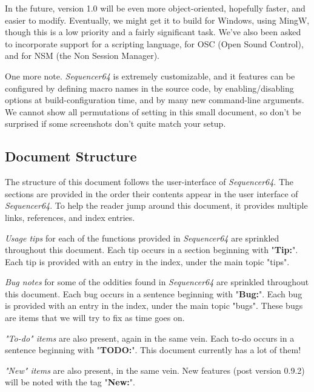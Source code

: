 \documentclass[
 11pt,
 twoside,
 a4paper,
 headinclude,
 footinclude,
 final                                 %
]{article}
\begin{document}
   In the future, version 1.0 will be even more object-oriented, hopefully
   faster, and easier to modify.  Eventually, we might get it to build
   for Windows, using MingW, though this is a low priority and a fairly
   significant task.  We've also been asked to incorporate support for a
   scripting language, for OSC (Open Sound Control), and for NSM (the Non
   Session Manager).

   One more note.  \textsl{Sequencer64} is extremely customizable, and
   it features can be configured by defining macro names in the source code,
   by enabling/disabling options at build-configuration time, and by many new
   command-line arguments.  We cannot show all permutations of setting in this
   small document, so don't be surprised if some screenshots don't quite match
   your setup.

\subsection{Document Structure}
\label{subsec:introduction_document_structure}

   The structure of this document follows the user-interface of
   \textsl{Sequencer64}.  The sections are provided in the order
   their contents appear in the user interface of \textsl{Sequencer64}.  To
   help the reader jump around this document, it provides
   multiple links, references, and index entries.

   \textsl{Usage tips}
   for each of the functions provided in
   \textsl{Sequencer64} are sprinkled throughout this document.
   Each tip occurs in a section beginning with "\textbf{Tip:}".
   Each tip is provided with an entry in the index, under the
   main topic "tips".

   \textsl{Bug notes}
   for some of the oddities found in \textsl{Sequencer64} are
   sprinkled throughout this document.
   Each bug occurs in a sentence beginning with "\textbf{Bug:}".
   Each bug is provided with an entry in the index, under the
   main topic "bugs".  These bugs are items that we will try to
   fix as time goes on.

   \textsl{"To-do" items}
   are also present, again in the same vein.
   Each to-do occurs in a sentence beginning with "\textbf{TODO:}".
   This document currently has a lot of them!

   \textsl{"New" items}
   are also present, in the same vein.
   New features (post version 0.9.2) will be noted with the tag
   "\textbf{New:}".
\end{document}
